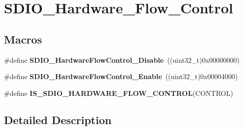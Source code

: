 \hypertarget{group___s_d_i_o___hardware___flow___control}{\section{S\-D\-I\-O\-\_\-\-Hardware\-\_\-\-Flow\-\_\-\-Control}
\label{group___s_d_i_o___hardware___flow___control}
}
\subsection*{Macros}
\begin{DoxyCompactItemize}
\item 
\hypertarget{group___s_d_i_o___hardware___flow___control_ga7529a3c8a11ac685bde4aafa12c8a977}{\#define {\bfseries S\-D\-I\-O\-\_\-\-Hardware\-Flow\-Control\-\_\-\-Disable}~((uint32\-\_\-t)0x00000000)}\label{group___s_d_i_o___hardware___flow___control_ga7529a3c8a11ac685bde4aafa12c8a977}

\item 
\hypertarget{group___s_d_i_o___hardware___flow___control_gab6cfef6778d829f3dcefc6c2bad7c9aa}{\#define {\bfseries S\-D\-I\-O\-\_\-\-Hardware\-Flow\-Control\-\_\-\-Enable}~((uint32\-\_\-t)0x00004000)}\label{group___s_d_i_o___hardware___flow___control_gab6cfef6778d829f3dcefc6c2bad7c9aa}

\item 
\#define {\bfseries I\-S\-\_\-\-S\-D\-I\-O\-\_\-\-H\-A\-R\-D\-W\-A\-R\-E\-\_\-\-F\-L\-O\-W\-\_\-\-C\-O\-N\-T\-R\-O\-L}(C\-O\-N\-T\-R\-O\-L)
\end{DoxyCompactItemize}


\subsection{Detailed Description}


